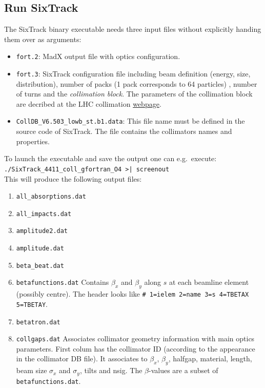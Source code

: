 \documentclass[a4paper, oneside, final]{scrartcl}
\begin{document}
{{\subsection{Run SixTrack}
The SixTrack binary executable needs three input files without explicitly handing them over as arguments:

\begin{itemize}
\item \texttt{fort.2}: MadX output file with optics configuration.
\item \texttt{fort.3}: SixTrack configuration file including beam definition (energy, size, distribution), number of packs (1 pack corresponds to 64 particles) , number of turns and the \textit{collimation block}. The parameters of the collimation block are decribed at the LHC collimation {\href{http://lhc-collimation-project.web.cern.ch/lhc-collimation-project/code-tracking-2012.php}{webpage}}.
\item \texttt{CollDB\_V6.503\_lowb\_st.b1.data}: This file name must be defined in the source code of SixTrack. The file contains the collimators names and properties.
\end{itemize}

To launch the executable and save the output one can e.g.~execute: \\
\texttt{./SixTrack\_4411\_coll\_gfortran\_O4 >| screenout} \\

This will produce the following output files:

\begin{enumerate}
\item \texttt{all\_absorptions.dat}
\item \texttt{all\_impacts.dat}
\item \texttt{amplitude2.dat}
\item \texttt{amplitude.dat}
\item \texttt{beta\_beat.dat}

\item \texttt{betafunctions.dat} Contains $\beta_x$ and $\beta_y$ along $s$ at each beamline element (possibly centre). The header looks like \texttt{\# 1=ielem 2=name 3=s 4=TBETAX 5=TBETAY}.

\item \texttt{betatron.dat}
\item \texttt{collgaps.dat} Associates collimator geometry information with main optics parameters. First colum has the collimator ID (according to the appearance in the collimator DB file). It associates to $\beta_x$, $\beta_y$, halfgap, material, length, beam size $\sigma_x$ and $\sigma_y$, tilts and nsig. The $\beta$-values are a subset of \texttt{betafunctions.dat}.


\end{enumerate}}}
\end{document}
